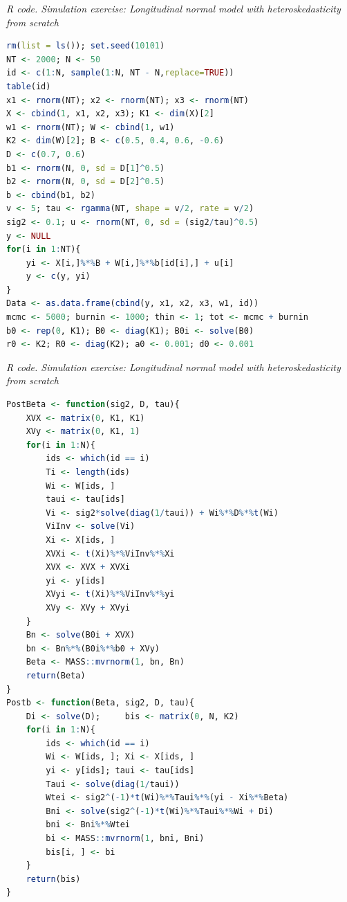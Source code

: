 \begin{tcolorbox}[enhanced,width=4.67in,center upper,
	fontupper=\large\bfseries,drop shadow southwest,sharp corners]
	\textit{R code. Simulation exercise: Longitudinal normal model with heteroskedasticity from scratch}
	\begin{VF}
		\begin{lstlisting}[language=R]
rm(list = ls()); set.seed(10101)
NT <- 2000; N <- 50
id <- c(1:N, sample(1:N, NT - N,replace=TRUE))
table(id)
x1 <- rnorm(NT); x2 <- rnorm(NT); x3 <- rnorm(NT) 
X <- cbind(1, x1, x2, x3); K1 <- dim(X)[2]
w1 <- rnorm(NT); W <- cbind(1, w1)
K2 <- dim(W)[2]; B <- c(0.5, 0.4, 0.6, -0.6)
D <- c(0.7, 0.6)
b1 <- rnorm(N, 0, sd = D[1]^0.5)
b2 <- rnorm(N, 0, sd = D[2]^0.5)
b <- cbind(b1, b2)
v <- 5; tau <- rgamma(NT, shape = v/2, rate = v/2)
sig2 <- 0.1; u <- rnorm(NT, 0, sd = (sig2/tau)^0.5)
y <- NULL
for(i in 1:NT){
	yi <- X[i,]%*%B + W[i,]%*%b[id[i],] + u[i] 
	y <- c(y, yi)
}
Data <- as.data.frame(cbind(y, x1, x2, x3, w1, id))
mcmc <- 5000; burnin <- 1000; thin <- 1; tot <- mcmc + burnin
b0 <- rep(0, K1); B0 <- diag(K1); B0i <- solve(B0) 
r0 <- K2; R0 <- diag(K2); a0 <- 0.001; d0 <- 0.001
\end{lstlisting}
	\end{VF}
\end{tcolorbox}


\begin{tcolorbox}[enhanced,width=4.67in,center upper,
	fontupper=\large\bfseries,drop shadow southwest,sharp corners]
	\textit{R code. Simulation exercise: Longitudinal normal model with heteroskedasticity from scratch}
	\begin{VF}
		\begin{lstlisting}[language=R]
PostBeta <- function(sig2, D, tau){
	XVX <- matrix(0, K1, K1)
	XVy <- matrix(0, K1, 1)
	for(i in 1:N){
		ids <- which(id == i)
		Ti <- length(ids)
		Wi <- W[ids, ]
		taui <- tau[ids]
		Vi <- sig2*solve(diag(1/taui)) + Wi%*%D%*%t(Wi)
		ViInv <- solve(Vi)
		Xi <- X[ids, ]
		XVXi <- t(Xi)%*%ViInv%*%Xi
		XVX <- XVX + XVXi
		yi <- y[ids]
		XVyi <- t(Xi)%*%ViInv%*%yi
		XVy <- XVy + XVyi
	}
	Bn <- solve(B0i + XVX)
	bn <- Bn%*%(B0i%*%b0 + XVy)
	Beta <- MASS::mvrnorm(1, bn, Bn)
	return(Beta)
}
Postb <- function(Beta, sig2, D, tau){
	Di <- solve(D); 	bis <- matrix(0, N, K2)
	for(i in 1:N){
		ids <- which(id == i)
		Wi <- W[ids, ]; Xi <- X[ids, ]
		yi <- y[ids]; taui <- tau[ids]
		Taui <- solve(diag(1/taui))
		Wtei <- sig2^(-1)*t(Wi)%*%Taui%*%(yi - Xi%*%Beta)
		Bni <- solve(sig2^(-1)*t(Wi)%*%Taui%*%Wi + Di)
		bni <- Bni%*%Wtei
		bi <- MASS::mvrnorm(1, bni, Bni)
		bis[i, ] <- bi
	}
	return(bis)
}
\end{lstlisting}
	\end{VF}
\end{tcolorbox}


